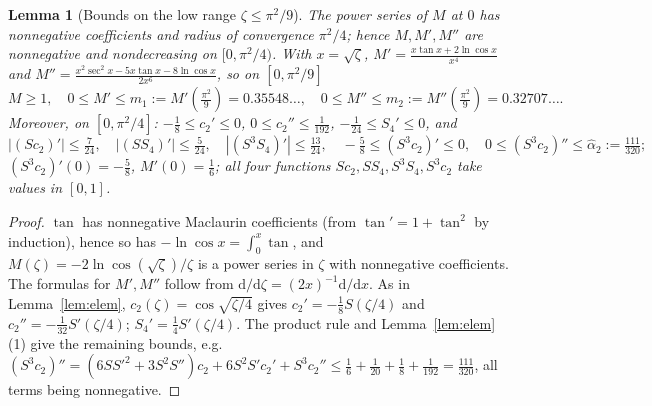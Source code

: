 \documentclass[11pt,a4paper]{article}
\newtheorem{lemma}[theorem]{Lemma}
\theoremstyle{definition}
\theoremstyle{remark}
\newcommand{\dd}{\mathrm{d}}
\begin{document}
\begin{lemma}[Bounds on the low range $\zeta\le\pi^2/9$]\label{lem:Mbounds}
The power series of $M$ at $0$ has nonnegative coefficients and radius of convergence $\pi^2/4$; hence
$M,M',M''$ are nonnegative and nondecreasing on $[0,\pi^2/4)$. With $x=\sqrt\zeta$,
$M'=\frac{x\tan x+2\ln\cos x}{x^4}$ and $M''=\frac{x^2\sec^2x-5x\tan x-8\ln\cos x}{2x^6}$, so on $[0,\pi^2/9]$
\[
  M\ge1,\quad 0\le M'\le m_1:=M'(\tfrac{\pi^2}9)=0.35548\ldots,\quad 0\le M''\le m_2:=M''(\tfrac{\pi^2}9)=0.32707\ldots .
\]
Moreover, on $[0,\pi^2/4]$: $-\frac18\le c_2'\le0$, $0\le c_2''\le\frac1{192}$, $-\frac1{24}\le S_4'\le0$, and
\[
 |(Sc_2)'|\le\tfrac7{24},\quad|(SS_4)'|\le\tfrac5{24},\quad|(S^3S_4)'|\le\tfrac{13}{24},\quad
 -\tfrac58\le(S^3c_2)'\le0,\quad 0\le(S^3c_2)''\le\hat\alpha_2:=\tfrac{111}{320};
\]
$(S^3c_2)'(0)=-\frac58$, $M'(0)=\frac16$; all four functions $Sc_2,SS_4,S^3S_4,S^3c_2$ take values in $[0,1]$.
\end{lemma}
\begin{proof}
$\tan$ has nonnegative Maclaurin coefficients (from $\tan'=1+\tan^2$ by induction), hence so has
$-\ln\cos x=\int_0^x\tan$, and $M(\zeta)=-2\ln\cos(\sqrt\zeta)/\zeta$ is a power series in $\zeta$ with nonnegative
coefficients. The formulas for $M',M''$ follow from $\dd/\dd\zeta=(2x)^{-1}\dd/\dd x$. As in Lemma~\ref{lem:elem},
$c_2(\zeta)=\cos\sqrt{\zeta/4}$ gives $c_2'=-\frac18S(\zeta/4)$ and $c_2''=-\frac1{32}S'(\zeta/4)$; $S_4'=\frac14S'(\zeta/4)$.
The product rule and Lemma~\ref{lem:elem}(1) give the remaining bounds, e.g.\
$(S^3c_2)''=(6SS'^2+3S^2S'')c_2+6S^2S'c_2'+S^3c_2''\le\frac16+\frac1{20}+\frac18+\frac1{192}=\frac{111}{320}$,
all terms being nonnegative.
\end{proof}
\end{document}
